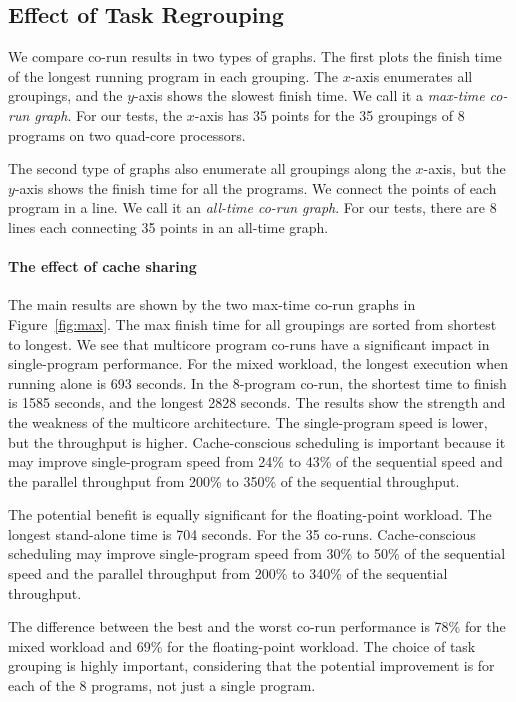 \subsection{Effect of Task Regrouping}

We compare co-run results in two types of graphs.  The first plots the
finish time of the longest running program in each grouping.  The
$x$-axis enumerates all groupings, and the $y$-axis shows the slowest
finish time.  We call it a \emph{max-time co-run graph}.  For our tests,
the $x$-axis has 35 points for the 35 groupings of 8 programs on two
quad-core processors.  

The second type of graphs also enumerate all groupings
along the $x$-axis, but the $y$-axis shows the finish time for all
the programs.  We connect the points of each program in a line.  We
call it an \emph{all-time co-run graph}.  For our tests, there are 8
lines each connecting 35 points in an all-time graph.

\paragraph{The effect of cache sharing}
The main results are shown by the two max-time co-run graphs in
Figure~\ref{fig:max}.  The max finish time for all groupings are
sorted from shortest to longest.  We see that multicore program
co-runs have a significant impact in single-program performance.  For
the mixed workload, the longest execution when running alone is 693
seconds.  In the 8-program co-run, the shortest time to finish is 1585
seconds, and the longest 2828 seconds.  The results show
the strength and the weakness of the multicore architecture. 
The single-program speed is lower, but the throughput is higher.
Cache-conscious scheduling is important because it may improve
single-program speed from 24\% to 43\% of the sequential speed and the
parallel throughput from 200\% to 350\% of the sequential throughput. 

The potential benefit is equally significant for the floating-point
workload.  The longest stand-alone time is 704 seconds.  For the
35 co-runs.  Cache-conscious scheduling may improve single-program
speed from 30\% to 50\% of the sequential speed and the parallel
throughput from 200\% to 340\% of the sequential throughput. 

The difference between the best and the worst co-run performance is
78\% for the mixed workload and 69\% for the floating-point workload.
The choice of task grouping is highly important, considering that the
potential improvement is for each of the 8 programs, not just a single
program. 

